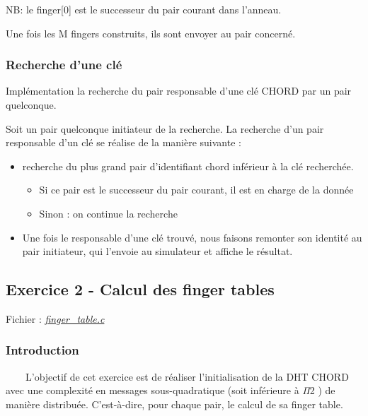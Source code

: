 \documentclass[
]{article}
\providecommand{\tightlist}{%
  \setlength{\itemsep}{0pt}\setlength{\parskip}{0pt}}
\begin{document}
NB: le finger{[}0{]} est le successeur du pair courant dans l'anneau.

Une fois les M fingers construits, ils sont envoyer au pair concerné.

\hypertarget{recherche-dune-cluxe9}{%
\subsubsection{Recherche d'une clé}\label{recherche-dune-cluxe9}}

Implémentation la recherche du pair responsable d'une clé CHORD par un
pair quelconque.

Soit un pair quelconque initiateur de la recherche. La recherche d'un
pair responsable d'un clé se réalise de la manière suivante :

\begin{itemize}
\tightlist
\item
  recherche du plus grand pair d'identifiant chord inférieur à la clé
  recherchée.

  \begin{itemize}
  \tightlist
  \item
    Si ce pair est le successeur du pair courant, il est en charge de la
    donnée
  \item
    Sinon : on continue la recherche
  \end{itemize}
\item
  Une fois le responsable d'une clé trouvé, nous faisons remonter son
  identité au pair initiateur, qui l'envoie au simulateur et affiche le
  résultat.
\end{itemize}

\hypertarget{exercice-2---calcul-des-finger-tables}{%
\subsection{Exercice 2 - Calcul des finger
tables}\label{exercice-2---calcul-des-finger-tables}}

Fichier : \href{Exercice_2/src/finger_table.c}{\emph{finger\_table.c}}

\hypertarget{introduction-1}{%
\subsubsection{Introduction}\label{introduction-1}}

  L'objectif de cet exercice est de réaliser l'initialisation de la DHT
CHORD avec une complexité en messages sous-quadratique (soit inférieure
à \emph{\textbar Π\textbar{}}2 ) de manière distribuée. C'est-à-dire,
pour chaque pair, le calcul de sa finger table.
\end{document}
